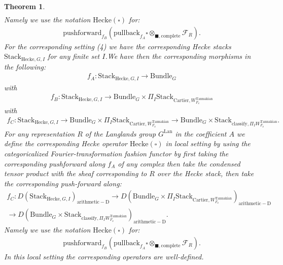 \documentclass[12pt]{book}
\newtheorem{theorem}{Theorem}
\theoremstyle{definition}
\begin{document}
\begin{theorem}
\begin{align}
\end{align}
Namely we use the notation $\mathrm{Hecke}(\square)$ for:
\begin{align}
\mathrm{pushforward}_{f_B}(\mathrm{pullback}_{f_A}\square\otimes_{\blacksquare,\mathrm{complete}}\mathcal{F}_R).
\end{align}
For the corresponding setting (4) we have the corresponding Hecke stacks $\mathrm{Stack}_{\mathrm{Hecke},G,I}$ for any finite set $I$.We have then the corresponding morphisms in the following:
\begin{align}
f_A: \mathrm{Stack}_{\mathrm{Hecke},G,I} \rightarrow \mathrm{Bundle}_{G}
\end{align}
with
\begin{align}
f_B: \mathrm{Stack}_{\mathrm{Hecke},G,I} \rightarrow \mathrm{Bundle}_{G}\times \Pi_I \mathrm{Stack}_{\mathrm{Cartier},W^\mathrm{Tannakian}_{F_x}}
\end{align}
with
\begin{align}
f_C: \mathrm{Stack}_{\mathrm{Hecke},G,I} \rightarrow \mathrm{Bundle}_{G}\times \Pi_I \mathrm{Stack}_{\mathrm{Cartier},W^\mathrm{Tannakian}_{F_x}}\rightarrow \mathrm{Bundle}_{G}\times \mathrm{Stack}_{\mathrm{classify},\Pi_I W^\mathrm{Tannakian}_{F_x}}.
\end{align}
For any representation $R$ of the Langlands group $G^\mathrm{Lan}$ in the coefficient $A$ we define the corresponding Hecke operator $\mathrm{Hecke}(\square)$ in local setting by using the categoricalized Fourier-transformation fashion functor by first taking the corresponding pushforward along $f_A$ of any complex then take the condensed tensor product with the sheaf corresponding to $R$ over the Hecke stack, then take the corresponding push-forward along:
\begin{align}
f_C: D(\mathrm{Stack}_{\mathrm{Hecke},G,I})_{\mathrm{arithmetic-D}} \rightarrow D(\mathrm{Bundle}_{G}\times \Pi_I\mathrm{Stack}_{\mathrm{Cartier},W^\mathrm{Tannakian}_{F_x}})_{\mathrm{arithmetic-D}} \\
 \rightarrow D(\mathrm{Bundle}_{G}\times \mathrm{Stack}_{\mathrm{classify},\Pi_I W^\mathrm{Tannakian}_{F_x}})_{\mathrm{arithmetic-D}}.
\end{align}
Namely we use the notation $\mathrm{Hecke}(\square)$ for:
\begin{align}
\mathrm{pushforward}_{f_B}(\mathrm{pullback}_{f_A}\square\otimes_{\blacksquare,\mathrm{complete}}\mathcal{F}_R).
\end{align}
In this local setting the corresponding operators are well-defined.
\end{theorem}
\end{document}
